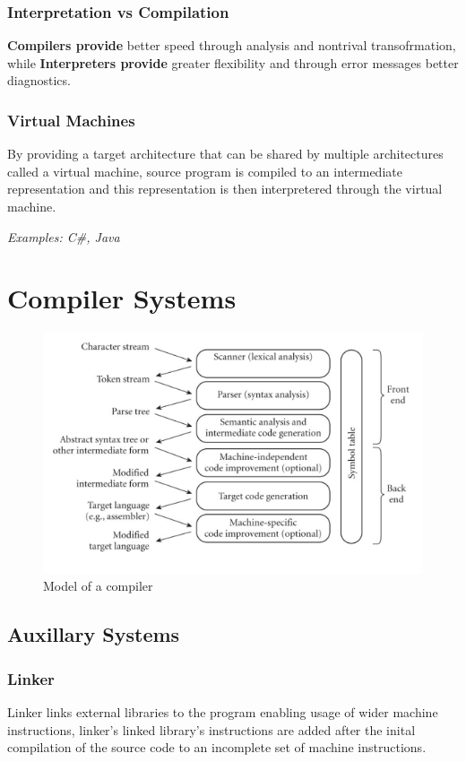 \documentclass[11pt]{book}
\begin{document}
\subsubsection{Interpretation vs Compilation}
\textbf{Compilers provide} better speed through analysis and nontrival transofrmation, while \textbf{Interpreters provide} greater flexibility and through error messages better diagnostics.

\subsubsection{Virtual Machines}
By providing a target architecture that can be shared by multiple architectures called a virtual machine, source program is compiled to an intermediate representation and this representation is then interpretered through the virtual machine.

\textit{Examples: C\#, Java}

\section{Compiler Systems}
\begin{figure}[h!]
	\center
	\includegraphics[scale=0.5]{../figures/01_phases_of_compilation.png}
	\caption{Model of a compiler}
\end{figure}

\subsection{Auxillary Systems}

\subsubsection{Linker}
Linker links external libraries to the program enabling usage of wider machine instructions, linker's linked library's instructions are added after the inital compilation of the source code to an incomplete set of machine instructions.
\end{document}
